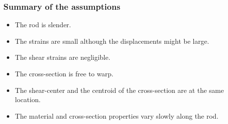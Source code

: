 

\subsubsection{Summary of the assumptions}
\begin{itemize}
\item The rod is slender.
\item The strains are small although the displacements might be large.
\item The shear strains are negligible.
\item The cross-section is free to warp.
\item The shear-center and the centroid of the cross-section are at the same location.
\item The material and cross-section properties vary slowly along the rod.
\end{itemize}
%

